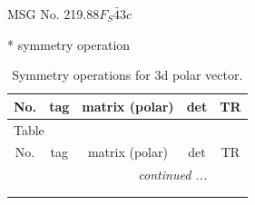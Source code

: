 \documentclass[fleqn,8pt]{jsarticle}
\begin{document}
\setcounter{MaxMatrixCols}{32}

\renewcommand{\tablename}{Table~}
\renewcommand{\figurename}{Figure~}
\begin{center}
\LARGE
MSG No. 219.88\quad$F_{S}\bar{4}3c$
\end{center}
* symmetry operation
\renewcommand{\arraystretch}{1.3}
\begin{longtable}{ccccc}
\caption{Symmetry operations for 3d polar vector.}
 \\
 \hline \hline
No. & tag & matrix (polar) & det & TR \\ \hline \endfirsthead

\multicolumn{4}{l}{\tablename\ \thetable{}} \\
 \hline \hline
No. & tag & matrix (polar) & det & TR \\ \hline \endhead

 \hline \hline
\multicolumn{4}{r}{\footnotesize\it continued ...} \\ \endfoot

 \hline \hline
\multicolumn{4}{r}{} \\ \endlastfoot


\end{longtable}
\end{document}
